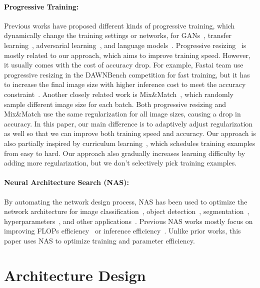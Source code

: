 \documentclass{article}
\begin{document}
\paragraph{Progressive Training:} Previous works have proposed different kinds of progressive training, which dynamically change the training settings or networks, for GANs~\cite{progressivegan18}, transfer learning~\cite{progressivegan18}, adversarial learning~\cite{progressiveadv19}, and language models~\cite{shortformer21}. Progressive resizing~\cite{fastaidawnbench} is mostly related to our approach, which aims to improve training speed. However, it usually comes with the cost of accuracy drop. For example, Fastai team use progressive resizing in the DAWNBench competition for fast training, but it has to increase the final image size with higher inference cost to meet the accuracy constraint~\cite{fastaidawnbench}. Another closely related work is Mix\&Match~\cite{mixmatch19}, which randomly sample different image size for each batch. Both progressive resizing and Mix\&Match use the same regularization for all image sizes, causing a drop in accuracy. In this paper, our main difference is to adaptively adjust regularization as well so that we can improve both training speed and accuracy. Our approach is also partially inspired by curriculum learning~\cite{curriculum09}, which schedules training examples from easy to hard. Our approach also gradually increases learning difficulty by adding more regularization, but we don't selectively pick training examples.

\paragraph{Neural Architecture Search (NAS):}
By automating the network design process, NAS has been used to optimize the network architecture for image classification~\cite{nas_imagenet18}, object detection~\cite{detnas19,efficientdet20}, segmentation~\cite{autodeeplab19}, hyperparameters~\cite{autohas20}, and other applications~\cite{elsken2019neural}. Previous NAS works mostly focus on improving FLOPs efficiency~\cite{mixconv19,efficientnet19} or inference efficiency~\cite{mnas19,proxyless19,fbnet19,efficientnetx21}. Unlike prior works, this paper uses NAS to optimize training and parameter efficiency.  \section{{\xnet} Architecture Design}
\label{sec:xnet}
\end{document}
